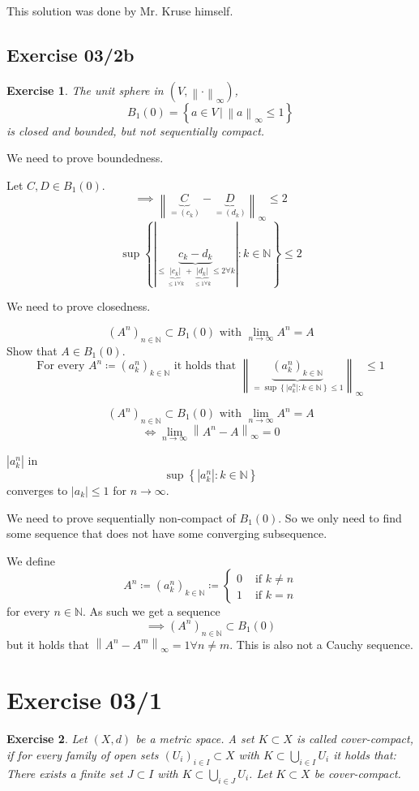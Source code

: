 \documentclass{article}
\newtheorem{ex}{Exercise} %
\newcommand{\set}[1]{\left\{#1\right\}}
\newcommand{\setdef}[2]{\left\{\left.#1\,\right|\,#2\right\}}
\newcommand{\norm}[1]{\left\|#1\right\|}
\newcommand{\card}[1]{\left|#1\right|}
\begin{document}
This solution was done by Mr. Kruse himself.

\subsection{Exercise 03/2b}
\begin{ex}
  The unit sphere in $(V, \norm{\cdot}_{\infty})$,
  \[ B_1(0) = \setdef{a \in V}{\norm{a}_{\infty} \leq 1} \]
  is closed and bounded, but not sequentially compact.
\end{ex}

We need to prove boundedness.

Let $C, D \in B_1(0)$.
\[ \implies \norm{\underbrace{C}_{= (c_k)} - \underbrace{D}_{=(d_k)}}_{\infty} \leq 2 \]
\[ \sup\set{\card{\underbrace{c_k - d_k}_{\leq \underbrace{\card{c_k}}_{\leq 1 \forall k} + \underbrace{\card{d_k}}_{\leq 1 \forall k} \leq 2 \forall k } }: k \in \mathbb N} \leq 2 \]

We need to prove closedness.

\[ (A^n)_{n \in \mathbb N} \subset B_1(0) \text{ with } \lim_{n\to\infty} A^n = A \]
Show that $A \in B_1(0)$.
\[ \text{For every } A^n \coloneqq (a^n_k)_{k \in \mathbb N} \text{ it holds that } \norm{\underbrace{(a^n_k)_{k \in \mathbb N}}_{= \sup\set{\card{a^n_k}: k \in \mathbb N} \leq 1}}_{\infty} \leq 1 \]

\[ (A^n)_{n \in \mathbb N} \subset B_1(0) \text{ with } \lim_{n\to\infty} A^n = A \]
\[ \iff \lim_{n \to \infty} \norm{A^n - A}_{\infty} = 0 \]

$\card{a^n_k}$ in
\[ \sup\set{\card{a^n_k}: k \in \mathbb N}  \]
converges to $\card{a_k} \leq 1$ for $n \to \infty$.

We need to prove sequentially non-compact of $B_1(0)$.
So we only need to find some sequence that does not have some converging subsequence.

We define
\[
  A^n \coloneqq (a^n_k)_{k \in \mathbb N} \coloneqq \begin{cases}
    0 & \text{ if } k \neq n \\
    1 & \text{ if } k = n
  \end{cases}
\]
for every $n \in \mathbb N$. As such we get a sequence
\[ \implies (A^n)_{n \in \mathbb N} \subset B_1(0) \]
but it holds that $\norm{A^n - A^m}_{\infty} = 1 \forall n \neq m$.
This is also not a Cauchy sequence.

\section{Exercise 03/1}
\begin{ex}
  Let $(X,d)$ be a metric space. A set $K \subset X$ is called cover-compact,
  if for every family of open sets $(U_i)_{i \in I} \subset X$ with $K \subset \bigcup_{i \in I} U_i$ it holds that:
  There exists a finite set $J \subset I$ with $K \subset \bigcup_{i \in J} U_i$. Let $K \subset X$ be cover-compact.
\end{ex}
\end{document}
